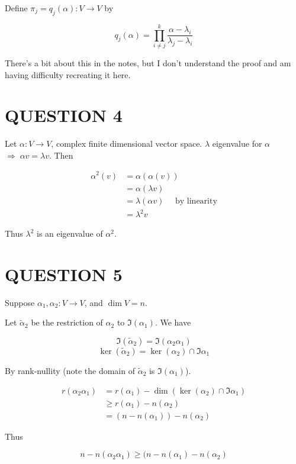 \documentclass[a4paper]{article}
\begin{document}
Define $ \pi_{j} = q_{j}(\alpha) : V \to V $ by

\[ q_{j}(\alpha) = \prod_{i \neq j}^{k}  \frac{\alpha - \lambda_{i}}{\lambda_{j} - \lambda_{i}} \]

There's a bit about this in the notes, but I don't understand the proof and am having difficulty recreating it here. 

\section{QUESTION 4}

Let $ \alpha: V \to V $, complex finite dimensional vector space. 
$ \lambda $ eigenvalue for $ \alpha $  $ \Rightarrow \; \alpha v = \lambda v $. Then

\begin{align*}
\alpha^{2}(v) & = \alpha( \alpha(v)) \\
& = \alpha (\lambda v) \\
& = \lambda (\alpha v) \quad \text{ by linearity} \\
& = \lambda^{2} v
\end{align*}

Thus $ \lambda^{2} $ is an eigenvalue of $ \alpha^{2} $. 

\section{QUESTION 5}

Suppose $ \alpha_{1},\alpha_{2} : V \to V $, and $ \dim V = n $.

Let $ \tilde{\alpha}_{2} $ be the restriction of $ \alpha_{2} $ to $ \Im(\alpha_{1}) $. We have 

\[ \Im(\tilde{\alpha}_{2}) = \Im(\alpha_{2}\alpha_{1}) \]
\[ \ker(\tilde{\alpha}_{2}) = \ker(\alpha_{2}) \cap \Im \alpha_{1}  \]

By rank-nullity (note the domain of $ \tilde{\alpha}_{2} $ is $ \Im(\alpha_{1}) $).

\begin{align*}
r(\alpha_{2}\alpha_{1})  & =  r(\alpha_{1}) - \dim(\ker(\alpha_{2}) \cap \Im \alpha_{1})  \\
& \geq r(\alpha_{1}) - n(\alpha_{2}) \\
& = (n - n(\alpha_{1})) -n(\alpha_{2})
\end{align*}

Thus

\[ n - n(\alpha_{2}\alpha_{1}) \geq (n - n(\alpha_{1})  - n(\alpha_{2} ) \]
\end{document}

